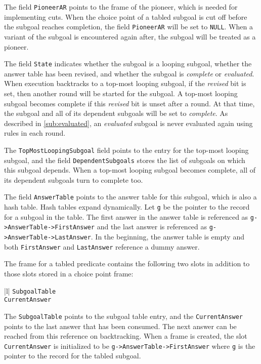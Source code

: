 \documentclass{tlp}
\begin{document}
The field {\tt PioneerAR} points to the frame of the pioneer, which is needed for implementing cuts. When the choice point of a tabled subgoal is cut off before the subgoal reaches completion, the field {\tt PioneerAR} will be set to {\tt NULL}. When a variant of the subgoal is encountered again after, the subgoal will be treated as a pioneer.

The field {\tt State} indicates whether the subgoal is a looping subgoal, whether the answer table has been revised, and whether the subgoal is {\it complete} or {\it evaluated}. When execution backtracks to a top-most looping subgoal, if the {\it revised} bit is set, then another round will be started for the subgoal. A top-most looping subgoal becomes complete if this {\it revised} bit is unset after a round. At that time, the subgoal and all of its dependent subgoals will be set to {\it complete}. As described in \ref{sub:evaluated}, an {\it evaluated} subgoal is never evaluated again using rules in each round.

The {\tt TopMostLoopingSubgoal} field points to the entry for the top-most looping subgoal, and the field {\tt DependentSubgoals} stores the list of subgoals on which this subgoal depends. When a top-most looping subgoal becomes complete, all of its dependent subgoals turn to complete too. 

The field {\tt AnswerTable} points to the answer table for this subgoal, which is also a hash table. Hash tables expand dynamically. Let {\tt g} be the pointer to the record for a subgoal in the table. The first answer in the answer table is referenced as \verb+g->AnswerTable->FirstAnswer+ and the last answer is referenced as \verb+g->AnswerTable->LastAnswer+. In the beginning, the answer table is empty and both {\tt FirstAnswer} and {\tt LastAnswer} reference a dummy answer.

The frame for a tabled predicate contains the following two slots in addition to those slots stored in a choice point frame:   
\begin{center}
\begin{oldtabular}{|l|}  \oldhline
{\tt SubgoalTable} \\ \oldhline
{\tt CurrentAnswer} \\ \oldhline
\end{oldtabular}
\end{center}

\noindent
The {\tt SubgoalTable} points to the subgoal table entry, and the {\tt CurrentAnswer} points to the last answer that has been consumed. The next answer can be reached from this reference on backtracking. When a frame is created, the slot {\tt CurrentAnswer} is initialized to be \verb+g->AnswerTable->FirstAnswer+ where {\tt g} is the pointer to the record for the tabled subgoal.
\end{document}
